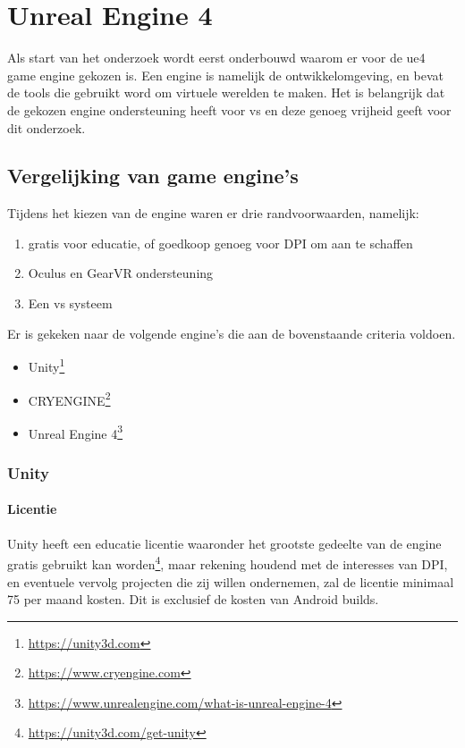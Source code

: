 \chapter{Unreal Engine 4}

Als start van het onderzoek wordt eerst onderbouwd waarom er voor de \gls{ue4} game engine gekozen is. Een engine is namelijk de ontwikkelomgeving, en bevat de tools die gebruikt word om virtuele werelden te maken. Het is belangrijk dat de gekozen engine ondersteuning heeft voor \gls{vs} en deze genoeg vrijheid geeft voor dit onderzoek.


\section{Vergelijking van game engine's}

Tijdens het kiezen van de engine waren er drie randvoorwaarden, namelijk: 
\begin{enumerate}
	\item gratis voor educatie, of goedkoop genoeg voor DPI om aan te schaffen
	\item Oculus en GearVR ondersteuning
	\item Een \gls{vs} systeem
\end{enumerate}

Er is gekeken naar de volgende engine's die aan de bovenstaande criteria voldoen.
\begin{itemize}
\item Unity\footnote{\url{https://unity3d.com}}
\item CRYENGINE\footnote{\url{https://www.cryengine.com}}
\item Unreal Engine 4\footnote{\url{https://www.unrealengine.com/what-is-unreal-engine-4}}
\end{itemize}

\subsection{Unity}

\subsubsection{Licentie}
Unity heeft een educatie licentie waaronder het grootste gedeelte van de engine gratis gebruikt kan worden\footnote{\url{https://unity3d.com/get-unity}}, maar rekening houdend met de interesses van DPI, en eventuele vervolg projecten die zij willen ondernemen, zal de licentie minimaal 75 per maand kosten. Dit is exclusief de kosten van Android builds.

